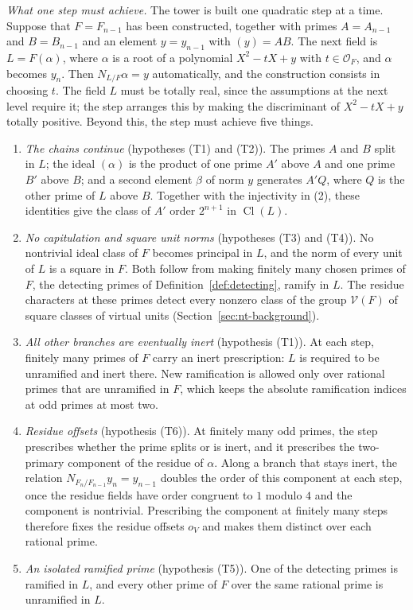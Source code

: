 \documentclass[11pt]{article}
\theoremstyle{plain}
\theoremstyle{definition}
\theoremstyle{remark}
\DeclareMathOperator{\Cl}{Cl}
\newcommand{\OO}{\mathcal O}
\begin{document}
\emph{What one step must achieve.}  The tower is built one quadratic step
at a time.  Suppose that $F=F_{n-1}$ has been constructed, together with
primes $A=A_{n-1}$ and $B=B_{n-1}$ and an element $y=y_{n-1}$ with
$(y)=AB$.  The next field is $L=F(\alpha)$, where $\alpha$ is a root of a
polynomial $X^2-tX+y$ with $t\in\OO_F$, and $\alpha$ becomes $y_n$.  Then
$N_{L/F}\alpha=y$ automatically, and the construction consists in choosing
$t$.  The field $L$ must be totally real, since the assumptions at the
next level require it; the step arranges this by making the discriminant
of $X^2-tX+y$ totally positive.  Beyond this, the step must achieve five
things.
\begin{enumerate}
\item[(1)] \emph{The chains continue} (hypotheses (T1) and (T2)).  The
primes $A$ and $B$ split in $L$; the ideal $(\alpha)$ is the product of one
prime $A'$ above $A$ and one prime $B'$ above $B$; and a second element
$\beta$ of norm $y$ generates $A'Q$, where $Q$ is the other prime of $L$
above $B$.  Together with the injectivity in (2), these identities give the
class of $A'$ order $2^{n+1}$ in $\Cl(L)$.
\item[(2)] \emph{No capitulation and square unit norms} (hypotheses (T3)
and (T4)).  No nontrivial ideal class of $F$ becomes principal in $L$, and
the norm of every unit of $L$ is a square in $F$.  Both follow from making
finitely many chosen primes of $F$, the detecting primes of
Definition~\ref{def:detecting}, ramify in $L$.  The residue characters at
these primes detect every nonzero class of the group $\mathcal V(F)$ of
square classes of virtual units (Section~\ref{sec:nt-background}).
\item[(3)] \emph{All other branches are eventually inert} (hypothesis
(T1)).  At each step, finitely many primes of $F$ carry an inert
prescription: $L$ is required to be unramified and inert there.  New
ramification is allowed only over rational primes that are unramified in
$F$, which keeps the absolute ramification indices at odd primes at most
two.
\item[(4)] \emph{Residue offsets} (hypothesis (T6)).  At finitely many odd
primes, the step prescribes whether the prime splits or is inert, and it
prescribes the two-primary component of the residue of $\alpha$.  Along a
branch that stays inert, the relation
$N_{F_n/F_{n-1}}y_n=y_{n-1}$ doubles the order of this component at each
step, once the residue fields have order congruent to $1$ modulo $4$ and
the component is nontrivial.  Prescribing the component at finitely many
steps therefore fixes the residue offsets $o_V$ and makes them distinct
over each rational prime.
\item[(5)] \emph{An isolated ramified prime} (hypothesis (T5)).  One of
the detecting primes is ramified in $L$, and every other prime of $F$ over
the same rational prime is unramified in $L$.
\end{enumerate}
\end{document}
